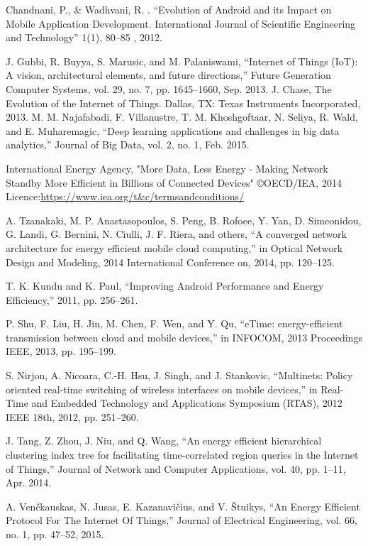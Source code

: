 Chandnani, P., \& Wadhvani, R. . “Evolution of Android and its Impact on Mobile Application Development. International Journal of Scientific Engineering and Technology”  1(1), 80–85 ,  2012.


J. Gubbi, R. Buyya, S. Marusic, and M. Palaniswami, “Internet of Things (IoT): A vision, architectural elements, and future directions,” Future Generation Computer Systems, vol. 29, no. 7, pp. 1645–1660, Sep. 2013.
J. Chase, The Evolution of the Internet of Things. Dallas, TX: Texas Instruments Incorporated, 2013.
M. M. Najafabadi, F. Villanustre, T. M. Khoshgoftaar, N. Seliya, R. Wald, and E. Muharemagic, “Deep learning applications and challenges in big data analytics,” Journal of Big Data, vol. 2, no. 1, Feb. 2015.

International Energy Agency, "More Data, Less Energy - Making Network Standby More Efficient in Billions of Connected Devices" \copyright OECD/IEA, 2014 Licence:\url{https://www.iea.org/t&c/termsandconditions/}

A. Tzanakaki, M. P. Anastasopoulos, S. Peng, B. Rofoee, Y. Yan, D. Simeonidou, G. Landi, G. Bernini, N. Ciulli, J. F. Riera, and others, “A converged network architecture for energy efficient mobile cloud computing,” in Optical Network Design and Modeling, 2014 International Conference on, 2014, pp. 120–125.

T. K. Kundu and K. Paul, “Improving Android Performance and Energy Efficiency,” 2011, pp. 256–261.

P. Shu, F. Liu, H. Jin, M. Chen, F. Wen, and Y. Qu, “eTime: energy-efficient transmission between cloud and mobile devices,” in INFOCOM, 2013 Proceedings IEEE, 2013, pp. 195–199.

S. Nirjon, A. Nicoara, C.-H. Hsu, J. Singh, and J. Stankovic, “Multinets: Policy oriented real-time switching of wireless interfaces on mobile devices,” in Real-Time and Embedded Technology and Applications Symposium (RTAS), 2012 IEEE 18th, 2012, pp. 251–260.

J. Tang, Z. Zhou, J. Niu, and Q. Wang, “An energy efficient hierarchical clustering index tree for facilitating time-correlated region queries in the Internet of Things,” Journal of Network and Computer Applications, vol. 40, pp. 1–11, Apr. 2014.

A. Venčkauskas, N. Jusas, E. Kazanavičius, and V. Štuikys, “An Energy Efficient Protocol For The Internet Of Things,” Journal of Electrical Engineering, vol. 66, no. 1, pp. 47–52, 2015.

